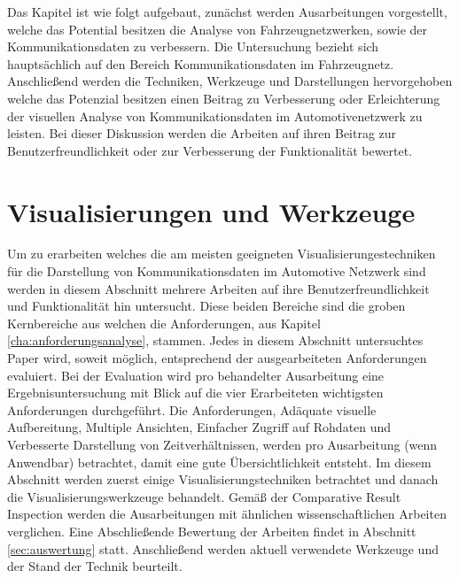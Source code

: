 \documentclass[draft=false
              ,paper=a4
              ,twoside=false
              ,fontsize=11pt
              ,headsepline
              ,BCOR10mm
              ,DIV11
              ]{scrbook}
\newcommand{\TODO}[1]{\colorbox{yellow}{\textcolor{red}{[TODO: #1]}}}
\begin{document}
Das Kapitel ist wie folgt aufgebaut, zunächst werden Ausarbeitungen vorgestellt, welche das Potential besitzen die Analyse von Fahrzeugnetzwerken, sowie der Kommunikationsdaten zu verbessern. Die Untersuchung bezieht sich hauptsächlich auf den Bereich Kommunikationsdaten im Fahrzeugnetz. Anschließend werden die Techniken, Werkzeuge und Darstellungen hervorgehoben welche das Potenzial besitzen einen Beitrag zu Verbesserung oder Erleichterung der visuellen Analyse von Kommunikationsdaten im Automotivenetzwerk zu leisten. Bei dieser Diskussion werden die Arbeiten auf ihren Beitrag zur Benutzerfreundlichkeit oder zur Verbesserung der Funktionalität bewertet. 



\section{Visualisierungen und Werkzeuge} %
\label{sec:visualisierungen_und_werkzeuge}
Um zu erarbeiten welches die am meisten geeigneten Visualisierungestechniken für die Darstellung von Kommunikationsdaten im Automotive Netzwerk sind werden in diesem Abschnitt mehrere Arbeiten auf ihre Benutzerfreundlichkeit und Funktionalität hin untersucht. Diese beiden Bereiche sind die groben Kernbereiche aus welchen die Anforderungen, aus Kapitel \ref{cha:anforderungsanalyse}, stammen. Jedes in diesem Abschnitt untersuchtes Paper wird, soweit möglich, entsprechend der ausgearbeiteten Anforderungen evaluiert. Bei der Evaluation wird pro behandelter Ausarbeitung eine Ergebnisuntersuchung mit Blick auf die vier Erarbeiteten wichtigsten Anforderungen durchgeführt. Die Anforderungen, Adäquate visuelle Aufbereitung, Multiple Ansichten, Einfacher Zugriff auf Rohdaten und Verbesserte Darstellung von Zeitverhältnissen, werden pro Ausarbeitung (wenn Anwendbar) betrachtet, damit eine gute Übersichtlichkeit entsteht. 
Im diesem Abschnitt werden zuerst einige Visualisierungstechniken betrachtet und danach die Visualisierungswerkzeuge behandelt. Gemäß der Comparative Result Inspection werden die Ausarbeitungen mit ähnlichen wissenschaftlichen Arbeiten verglichen. Eine Abschließende Bewertung der Arbeiten findet in Abschnitt \ref{sec:auswertung} statt. Anschließend werden aktuell verwendete Werkzeuge und der Stand der Technik beurteilt. 
\end{document}
